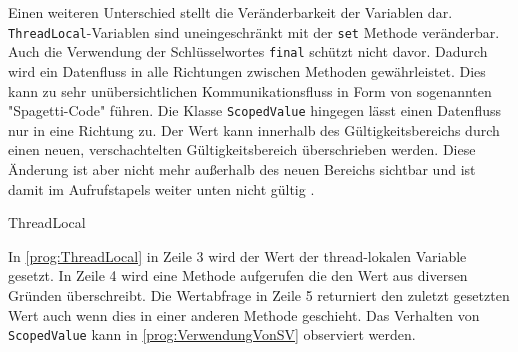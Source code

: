     Einen weiteren Unterschied stellt die Veränderbarkeit der Variablen dar. \texttt{ThreadLocal}-Variablen sind uneingeschränkt mit der \texttt{set} Methode veränderbar.
    Auch die Verwendung der Schlüsselwortes \texttt{final} schützt nicht davor. Dadurch wird ein Datenfluss in alle Richtungen zwischen Methoden gewährleistet. Dies kann zu sehr unübersichtlichen 
    Kommunikationsfluss in Form von sogenannten "Spagetti-Code" führen. Die Klasse \texttt{ScopedValue} hingegen lässt einen Datenfluss nur in eine Richtung zu. Der Wert kann innerhalb des 
    Gültigkeitsbereichs durch einen neuen, verschachtelten Gültigkeitsbereich überschrieben werden. Diese Änderung ist aber nicht mehr außerhalb des neuen Bereichs sichtbar und ist damit im Aufrufstapels weiter
    unten nicht gültig \cite{JEP481}.
    \begin{program} [H]
        \caption{ThreadLocal}
        \label{prog:ThreadLocal}
    \begin{JavaCode}[language=Java, numbers=left]
static ThreadLocal<String> threadLokal = new ThreadLocal<>();
public static void main(String[] args) {
    threadLokal.set("the negative side of Threadlocal");
    printHello();
    System.out.println(STR."This is a Methode to show \{threadLokal.get()}");
    threadLokal.remove();
}

public static void printHello() {
    threadLokal.set(Thread.currentThread().toString());
    System.out.println(STR."Hello from \{threadLokal.get()}");
}\end{JavaCode}
    \end{program}
    In \ref{prog:ThreadLocal} in Zeile 3 wird der Wert der thread-lokalen Variable gesetzt. In Zeile 4 wird eine Methode aufgerufen die den Wert aus diversen Gründen überschreibt. Die Wertabfrage in Zeile 5
    returniert den zuletzt gesetzten Wert auch wenn dies in einer anderen Methode geschieht. Das Verhalten von \texttt{ScopedValue} kann in \ref{prog:VerwendungVonSV} observiert werden.


